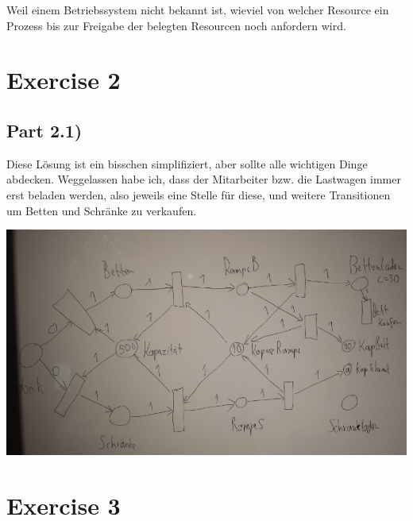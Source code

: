 \documentclass[10pt,a4paper]{article}
\begin{document}
Weil einem Betriebssystem nicht bekannt ist, wieviel von welcher Resource ein Prozess bis zur Freigabe der belegten Resourcen noch anfordern wird.

\section*{Exercise 2}

\subsection*{Part 2.1)}

Diese Lösung ist ein bisschen simplifiziert, aber sollte alle wichtigen Dinge abdecken.
Weggelassen habe ich, dass der Mitarbeiter bzw. die Lastwagen immer erst beladen werden, also jeweils eine Stelle für diese, und weitere Transitionen um Betten und Schränke zu verkaufen.

\includegraphics[width=\textwidth]{sheet-5/exercise-2}

\section*{Exercise 3}

\inputminted{c}{sheet-5/main.c}
\end{document}
